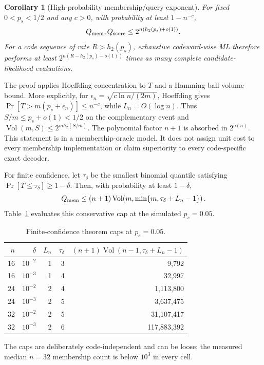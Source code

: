 \documentclass[conference]{IEEEtran}
\newtheorem{corollary}[theorem]{Corollary}
\newcommand{\Vol}{\operatorname{Vol}}
\begin{document}
\begin{corollary}[High-probability membership/query exponent]\label{cor:exp}
For fixed $0<p_s<1/2$ and any $c>0$, with probability at least $1-n^{-c}$,
\[
 Q_{\rm mem},Q_{\rm score}\le2^{n(h_2(p_s)+o(1))}.
\]
For a code sequence of rate $R>h_2(p_s)$, exhaustive codeword-wise ML therefore performs at least
$2^{n(R-h_2(p_s)-o(1))}$ times as many complete candidate-likelihood evaluations.
\end{corollary}
The proof applies Hoeffding concentration to $T$ and a Hamming-ball volume bound. More explicitly,
for $\epsilon_n=\sqrt{c\ln n/(2m)}$, Hoeffding gives
$\Pr[T>m(p_s+\epsilon_n)]\le n^{-c}$, while $L_n=O(\log n)$. Thus $S/m\le p_s+o(1)<1/2$ on the
complementary event and $\Vol(m,S)\le2^{m h_2(S/m)}$. The polynomial factor $n+1$ is absorbed in
$2^{o(n)}$. This statement is in a membership-oracle model. It does not assign unit cost to every
membership implementation or claim superiority to every code-specific exact decoder.

For finite confidence, let $\tau_\delta$ be the smallest binomial quantile satisfying
$\Pr[T\le\tau_\delta]\ge1-\delta$. Then, with probability at least $1-\delta$,
\begin{equation}
 Q_{\rm mem}\le(n+1)\Vol\!\left(m,\min\{m,\tau_\delta+L_n-1\}\right). \label{eq:finitecap}
\end{equation}
Table~\ref{tab:theorycaps} evaluates this conservative cap at the simulated $p_s=0.05$.
\begin{table}[t]
\caption{Finite-confidence theorem caps at $p_s=0.05$.}
\label{tab:theorycaps}
\centering\footnotesize
\setlength{\tabcolsep}{4pt}\renewcommand{\arraystretch}{1.08}
\begin{tabular}{@{}rrrrr@{}}
\toprule
$n$ & $\delta$ & $L_n$ & $\tau_\delta$ & $(n+1)\Vol(n-1,\tau_\delta+L_n-1)$\\
\midrule
16 & $10^{-2}$ & 1 & 3 & 9,792\\
16 & $10^{-3}$ & 1 & 4 & 32,997\\
24 & $10^{-2}$ & 2 & 4 & 1,113,800\\
24 & $10^{-3}$ & 2 & 5 & 3,637,475\\
32 & $10^{-2}$ & 2 & 5 & 31,107,417\\
32 & $10^{-3}$ & 2 & 6 & 117,883,392\\
\bottomrule
\end{tabular}
\end{table}
The caps are deliberately code-independent and can be loose; the measured median $n=32$ membership
count is below $10^3$ in every cell.
\end{document}
